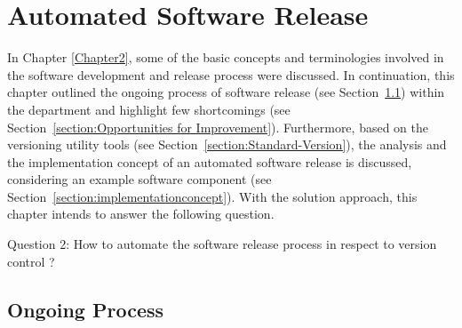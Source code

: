 
\chapter{Automated Software Release} %
\label{Chapter 4}

In Chapter \ref{Chapter2}, some of the basic concepts and terminologies involved in the software development and release process were discussed. In continuation, this chapter outlined the ongoing process of software release (see Section~\ref{section:OngoingProcessofSoftware Release}) within the department and highlight few shortcomings (see Section~\ref{section:Opportunities for Improvement}). Furthermore, based on the versioning utility tools (see Section~\ref{section:Standard-Version}), the analysis and the implementation concept of an automated software release is discussed, considering an example software component (see Section~\ref{section:implementationconcept}). With the solution approach, this chapter intends to answer the following question.




\vspace{0.2cm}
\noindent Question 2: How to automate the software release process in respect to version control ?




\section{Ongoing Process}\label{section:OngoingProcessofSoftware Release}


